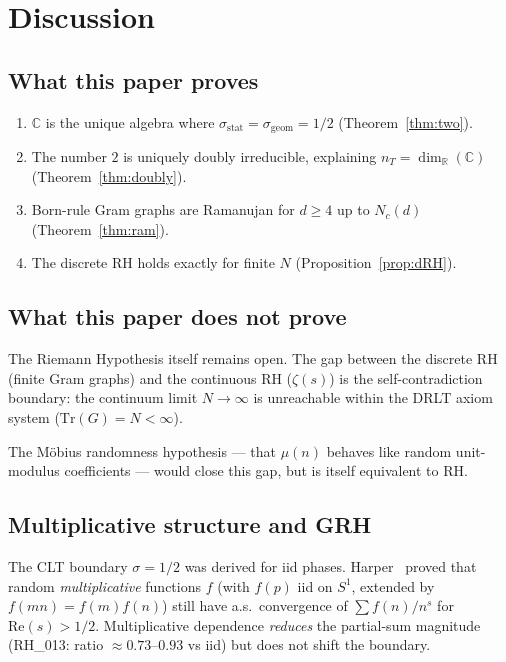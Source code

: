 \documentclass[12pt]{article}
\theoremstyle{definition}
\theoremstyle{remark}
\newcommand{\CC}{\mathbb{C}}
\newcommand{\RR}{\mathbb{R}}
\newcommand{\Tr}{\mathrm{Tr}}
\begin{document}
\section{Discussion}
\label{sec:disc}

\subsection{What this paper proves}

\begin{enumerate}
\item $\CC$ is the unique algebra where $\sigma_{\mathrm{stat}} =
  \sigma_{\mathrm{geom}} = 1/2$ (Theorem~\ref{thm:two}).
\item The number $2$ is uniquely doubly irreducible, explaining
  $n_T = \dim_\RR(\CC)$ (Theorem~\ref{thm:doubly}).
\item Born-rule Gram graphs are Ramanujan for $d \geq 4$
  up to $N_c(d)$ (Theorem~\ref{thm:ram}).
\item The discrete RH holds exactly for finite $N$
  (Proposition~\ref{prop:dRH}).
\end{enumerate}

\subsection{What this paper does not prove}

The Riemann Hypothesis itself remains open.
The gap between the discrete RH (finite Gram graphs)
and the continuous RH ($\zeta(s)$) is the self-contradiction
boundary: the continuum limit $N \to \infty$ is unreachable
within the DRLT axiom system ($\Tr(G) = N < \infty$).

The M\"obius randomness hypothesis --- that $\mu(n)$ behaves
like random unit-modulus coefficients --- would close this gap,
but is itself equivalent to RH.

\subsection{Multiplicative structure and GRH}

The CLT boundary $\sigma = 1/2$ was derived for iid phases.
Harper~\cite{Harper} proved that random \emph{multiplicative}
functions $f$ (with $f(p)$ iid on $S^1$, extended by
$f(mn) = f(m)f(n)$) still have a.s.\ convergence of
$\sum f(n)/n^s$ for $\mathrm{Re}(s) > 1/2$.
Multiplicative dependence \emph{reduces} the partial-sum
magnitude (RH\_013: ratio $\approx 0.73$--$0.93$ vs iid)
but does not shift the boundary.
\end{document}
